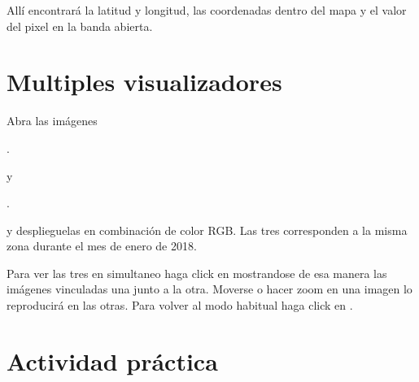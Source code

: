 Allí encontrará la latitud y longitud, las coordenadas dentro del mapa y el valor del pixel en la banda abierta.

\section{Multiples visualizadores}

Abra las imágenes
\begin{center} .
\end{center}
y
\begin{center} .
\end{center}

y desplieguelas en combinación de color RGB. Las tres corresponden a la misma zona durante el mes de enero de 2018.

Para ver las tres en simultaneo haga click en  mostrandose de esa manera las imágenes vinculadas una junto a la otra. Moverse o hacer zoom en una imagen lo reproducirá en las otras. Para volver al modo habitual haga click en .

\section{Actividad práctica}

